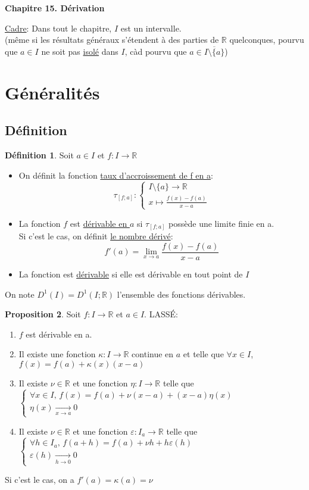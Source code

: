 \documentclass[10pt,a4paper]{article}
\theoremstyle{definition}
\newtheorem{proposition}{Proposition}[section]
\newtheorem{definition}[proposition]{Définition}
\begin{document}
\renewcommand{\labelitemi}{$*$}
\renewcommand{\labelenumi}{(\roman{enumi})}
\begin{center}
{\Large \textbf{Chapitre 15. Dérivation}}
\end{center}
\uline{Cadre}: Dans tout le chapitre, $I$ est un intervalle. \\
(même si les résultats généraux s'étendent à des parties de $\mathbb{R}$ quelconques, pourvu que $a \in I$ ne soit pas \uline{isolé} dans $I$, càd pourvu que $a \in \overline{I \setminus \{ a \}}$)

\section{Généralités}
\subsection{Définition}
\begin{definition}
Soit $a \in I$ et $f: I \to \mathbb{R}$
\begin{itemize}
\item On définit la fonction \uline{taux d'accroissement de f en a}:
\[\tau_{[f; a]} : \begin{cases}
I \setminus \{ a \} \to \mathbb{R} \\
x \mapsto \frac{f(x) - f(a)}{x - a}
\end{cases}\]
\item La fonction $f$ est \uline{dérivable en $a$} si $\tau_{[f; a]}$ possède une limite finie en a. \\
Si c'est le cas, on définit \uline{le nombre dérivé}:
\[f'(a) = \lim\limits_{x \to a} \frac{f(x) - f(a)}{x - a}\]
\item La fonction est \uline{dérivable} si elle est dérivable en tout point de $I$
\end{itemize}
On note $D^1(I) = D^1(I; \mathbb{R})$ l'ensemble des fonctions dérivables.
\end{definition}
\begin{proposition}
Soit $f:I \to \mathbb{R}$ et $a \in I$. LASSÉ:
\begin{enumerate}
\item $f$ est dérivable en a.
\item Il existe une fonction $\kappa: I \to \mathbb{R}$ continue en $a$ et telle que $\forall x \in I$, $f(x) = f(a) + \kappa(x)(x - a)$
\item Il existe $\nu \in \mathbb{R}$ et une fonction $\eta: I \to \mathbb{R}$ telle que $\begin{cases}
\forall x \in I ,\, f(x) = f(a) + \nu(x - a) + (x - a) \eta(x) \\
\eta(x) \xrightarrow[x \to a]{} 0 
\end{cases}$
\item Il existe $\nu \in \mathbb{R}$ et une fonction $\varepsilon: I_a \to \mathbb{R}$ telle que $\begin{cases}
\forall h \in I_a ,\, f(a + h) = f(a) + \nu h + h \varepsilon(h) \\
\varepsilon(h) \xrightarrow[h \to 0]{} 0
\end{cases}$
\end{enumerate}
Si c'est le cas, on a $f'(a) = \kappa(a) = \nu$
\end{proposition}
\end{document}
